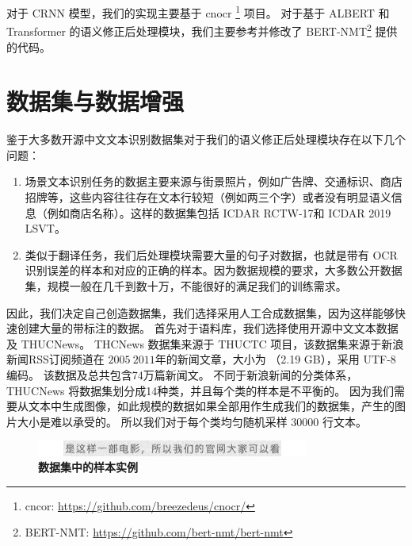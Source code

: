 对于 CRNN 模型，我们的实现主要基于 cnocr \footnote{cncor: \url{https://github.com/breezedeus/cnocr/}} 项目。
对于基于 ALBERT 和 Transformer 的语义修正后处理模块，我们主要参考并修改了 BERT-NMT\footnote{BERT-NMT: \url{https://github.com/bert-nmt/bert-nmt}} 提供的代码。


\section{数据集与数据增强}
\label{dataset}
鉴于大多数开源中文文本识别数据集对于我们的语义修正后处理模块存在以下几个问题：

\begin{enumerate}[(1)]
	\item 场景文本识别任务的数据主要来源与街景照片，例如广告牌、交通标识、商店招牌等，这些内容往往存在文本行较短（例如两三个字）或者没有明显语义信息（例如商店名称）。这样的数据集包括 ICDAR RCTW-17\cite{RCTW}和 ICDAR 2019 LSVT\cite{lsvt}。
	\item 类似于翻译任务，我们后处理模块需要大量的句子对数据，也就是带有 OCR 识别误差的样本和对应的正确的样本。因为数据规模的要求，大多数公开数据集，规模一般在几千到数十万，不能很好的满足我们的训练需求。
\end{enumerate}

因此，我们决定自己创造数据集，我们选择采用人工合成数据集，因为这样能够快速创建大量的带标注的数据。
首先对于语料库，我们选择使用开源中文文本数据及 THUCNews。
THCNews 数据集来源于 THUCTC\cite{sum2016thuctc} 项目，该数据集来源于新浪新闻RSS订阅频道在 $2005~2011$年的新闻文章，大小为 （2.19 GB），采用 UTF-8 编码。
该数据及总共包含74万篇新闻文。
不同于新浪新闻的分类体系，THUCNews 将数据集划分成14种类，并且每个类的样本是不平衡的。
因为我们需要从文本中生成图像，如此规模的数据如果全部用作生成我们的数据集，产生的图片大小是难以承受的。
所以我们对于每个类均匀随机采样 $30000$ 行文本。

\begin{figure}[h!]
	\centering
	\includegraphics[width=0.8\textwidth]{figure/resources/sample.png}
	\caption{\textbf{数据集中的样本实例}\label{sample}}
\end{figure}

